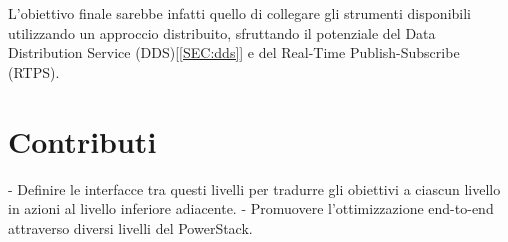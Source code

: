 L'obiettivo finale sarebbe infatti quello di collegare gli strumenti disponibili utilizzando un approccio distribuito, sfruttando il potenziale del Data Distribution Service (DDS)[\ref{SEC:dds}] e del Real-Time Publish-Subscribe (RTPS).


\section{Contributi}
- Definire le interfacce tra questi livelli per tradurre gli obiettivi a ciascun livello in azioni al livello inferiore adiacente.
- Promuovere l'ottimizzazione end-to-end attraverso diversi livelli del PowerStack.


